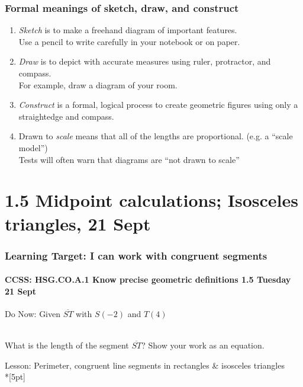 \documentclass{beamer}
\begin{document}
\frame
{
  \frametitle{Formal meanings of sketch, draw, and construct}
  \begin{enumerate}
    \item \emph{Sketch} is to make a freehand diagram of important features. \\[0.15cm]
    Use a pencil to write carefully in your notebook or on paper.  \smallskip
    \item \emph{Draw}  is to depict with accurate measures using ruler, protractor, and compass.\\[0.15cm]
    For example, draw a diagram of your room. \smallskip
    \item \emph{Construct} is a formal, logical process to create geometric figures using only a straightedge and compass. \smallskip
    \item Drawn to \emph{scale} means that all of the lengths are proportional. (e.g. a ``scale model'')\\[0.15cm]
    Tests will often warn that diagrams are ``not drawn to scale''
  \end{enumerate}
}

  \section{1.5 Midpoint calculations; Isosceles triangles, 21 Sept}
  \frame
  {
    \frametitle{Learning Target: I can work with congruent segments}
    \framesubtitle{CCSS: HSG.CO.A.1 Know precise geometric definitions  \hfill \alert{1.5 Tuesday 21 Sept}}
  
    \begin{block}{Do Now: Given $\overline{ST}$ with $S(-2)$ and $T(4)$}
       \\ \bigskip
  What is the length of the segment $\overline{ST}$? Show your work as an equation.
    \end{block}
    Lesson: Perimeter, congruent line segments in rectangles \& isosceles triangles \\*[5pt]
  }
\end{document}
